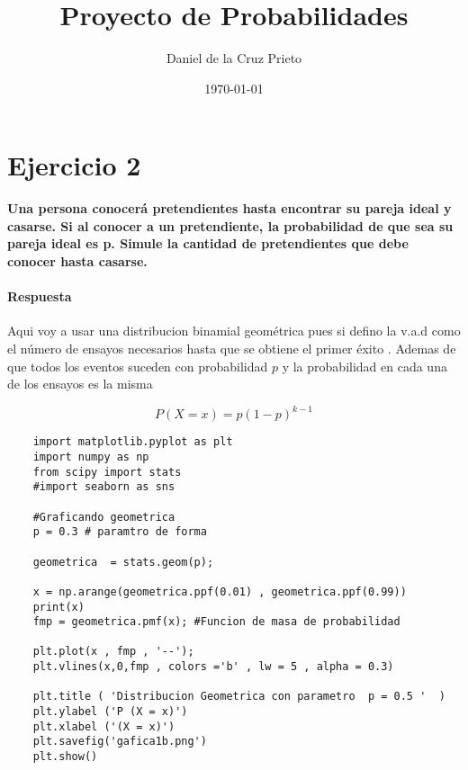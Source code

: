\documentclass{article}
\begin{document}
    \title{Proyecto de Probabilidades} 
	\author{Daniel de la Cruz Prieto}
	\date{\today}    
    \maketitle
    
    \section*{Ejercicio 2 }  
    {\bf Una persona conocer\'a pretendientes hasta encontrar su pareja ideal y
    casarse. Si al conocer a un pretendiente, la probabilidad de que sea su pareja ideal
    es p. Simule la cantidad de pretendientes que debe conocer hasta casarse.}
    
    \paragraph{Respuesta} 

    Aqui voy a usar una distribucion binamial geom\'etrica  pues si defino la v.a.d como 
    el n\'umero de ensayos necesarios hasta que se obtiene el primer \'exito . Ademas de 
    que todos los eventos suceden con probabilidad $p$ y la probabilidad en cada una de 
    los ensayos es la misma 

    \begin{equation}
        P \left(X = x \right) = p \left(1-p\right)^{k-1} 
    \end{equation}


    \begin{verbatim} 
    import matplotlib.pyplot as plt 
    import numpy as np 
    from scipy import stats 
    #import seaborn as sns 

    #Graficando geometrica 
    p = 0.3 # paramtro de forma 

    geometrica  = stats.geom(p); 

    x = np.arange(geometrica.ppf(0.01) , geometrica.ppf(0.99))
    print(x) 
    fmp = geometrica.pmf(x); #Funcion de masa de probabilidad 

    plt.plot(x , fmp , '--'); 
    plt.vlines(x,0,fmp , colors ='b' , lw = 5 , alpha = 0.3) 

    plt.title ( 'Distribucion Geometrica con parametro  p = 0.5 '  )
    plt.ylabel ('P (X = x)') 
    plt.xlabel ('(X = x)')
    plt.savefig('gafica1b.png')
    plt.show() 
    \end{verbatim}
    
\end{document}
